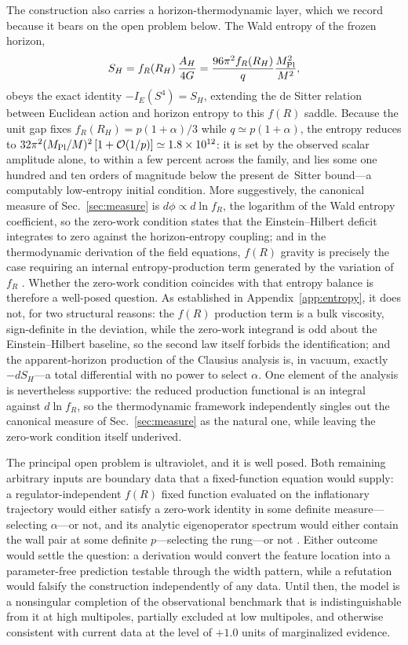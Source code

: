 \documentclass[aps,prd,twocolumn,superscriptaddress,nofootinbib,longbibliography]{revtex4-2}
\newcommand{\Mpl}{M_{\rm Pl}}
\begin{document}
The construction also carries a horizon-thermodynamic layer, which we record
because it bears on the open problem below. The Wald entropy
\cite{Wald1993} of the frozen horizon,
\begin{equation}
S_H=f_R(R_H)\,\frac{A_H}{4G}=\frac{96\pi^2 f_R(R_H)}{q}\frac{\Mpl^2}{M^2},
\end{equation}
obeys the exact identity $-I_E(S^4)=S_H$, extending the de Sitter relation
between Euclidean action and horizon entropy to this $f(R)$ saddle. Because the unit gap fixes
$f_R(R_H)=p(1+\alpha)/3$ while $q\simeq p(1+\alpha)$, the entropy reduces to
$32\pi^2(\Mpl/M)^2\,[1+\mathcal{O}(1/p)]\simeq1.8\times10^{12}$: it is set by
the observed scalar amplitude alone, to within a few percent across the
family, and lies some one hundred and ten orders of magnitude below the present
de~Sitter bound---a computably low-entropy initial condition. More
suggestively, the canonical measure of Sec.~\ref{sec:measure} is
$d\phi\propto d\ln f_R$, the logarithm of the Wald entropy coefficient, so
the zero-work condition states that the Einstein--Hilbert deficit integrates
to zero against the horizon-entropy coupling; and in the thermodynamic
derivation of the field equations, $f(R)$ gravity is precisely the case
requiring an internal entropy-production term generated by the variation of
$f_R$ \cite{Jacobson1995,EGJ2006,ChircoLiberati2010}. Whether the zero-work condition coincides
with that entropy balance is therefore a well-posed question. As established
in Appendix~\ref{app:entropy}, it does not, for two structural reasons: the $f(R)$ production term is a bulk viscosity, sign-definite in
the deviation, while the zero-work integrand is odd about the
Einstein--Hilbert baseline, so the second law itself forbids the
identification; and the apparent-horizon production of the Clausius
analysis \cite{AkbarCai2007} is, in vacuum, exactly $-dS_H$---a total
differential with no power to select $\alpha$. One element of the analysis is nevertheless
supportive: the reduced production functional is an integral
against $d\ln f_R$, so the thermodynamic framework independently singles
out the canonical measure of Sec.~\ref{sec:measure} as the natural one,
while leaving the zero-work condition itself underived.

The principal open problem is ultraviolet, and it is well posed. Both
remaining arbitrary inputs are boundary data that a fixed-function equation
would supply: a regulator-independent $f(R)$ fixed function evaluated on the
inflationary trajectory would either satisfy a zero-work identity in some
definite measure---selecting $\alpha$---or not, and its analytic eigenoperator
spectrum would either contain the wall pair at some definite $p$---selecting
the rung---or not \cite{DietzMorris2012,BonannoContilloPercacci2010}. Either
outcome would settle the question: a derivation would convert the feature
location into a
parameter-free prediction testable through the width pattern, while a
refutation would falsify the construction independently of any data. Until
then, the model is a nonsingular completion of the observational benchmark
that is indistinguishable from it at high multipoles, partially excluded at
low multipoles, and otherwise consistent with current data at the level of
$+1.0$ units of marginalized evidence.
\end{document}
